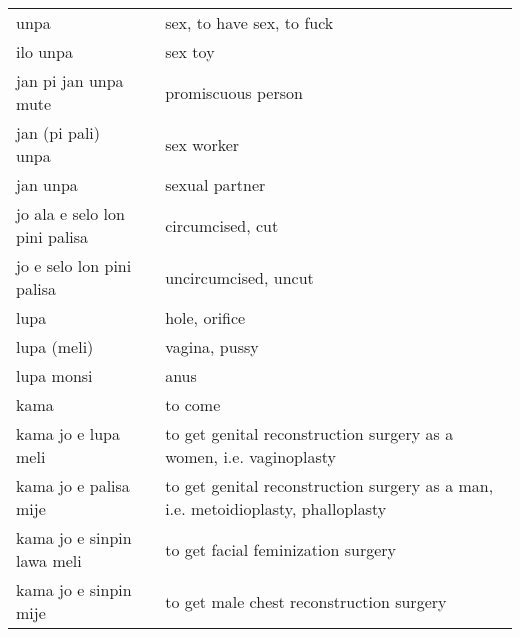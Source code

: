 \begin{supertabular}{p{4,5cm}|ll}
    unpa                               &  & sex, to have sex, to fuck                                                         \\
    ilo unpa                           &  & sex toy                                                                           \\
    jan pi jan unpa mute               &  & promiscuous person                                                                \\
    jan (pi pali) unpa                 &  & sex worker                                                                        \\
    jan unpa                           &  & sexual partner                                                                    \\
    jo ala e selo lon pini palisa      &  & circumcised, cut                                                                  \\
    jo e selo lon pini palisa          &  & uncircumcised, uncut                                                              \\
    lupa                               &  & hole, orifice                                                                     \\
    lupa (meli)                        &  & vagina, pussy                                                                     \\
    lupa monsi                         &  & anus                                                                              \\
    kama                               &  & to come                                                                           \\
    kama jo e lupa meli                &  & to get genital reconstruction surgery as a women, i.e. vaginoplasty               \\
    kama jo e palisa mije              &  & to get genital reconstruction surgery as a man, i.e. metoidioplasty, phalloplasty \\
    kama jo e sinpin lawa meli         &  & to get facial feminization surgery                                                \\
    kama jo e sinpin mije              &  & to get male chest reconstruction surgery                                          \\

\end{supertabular}
